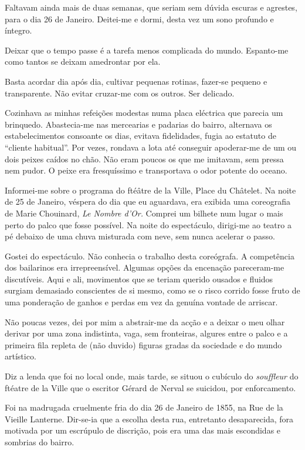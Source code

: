 Faltavam ainda mais de duas semanas, que seriam sem dúvida escuras e
agrestes, para o dia 26 de Janeiro. Deitei-me e dormi, desta vez um sono
profundo e íntegro.

Deixar que o tempo passe é a tarefa menos complicada do mundo.
Espanto-me como tantos se deixam amedrontar por ela.

Basta acordar dia após dia, cultivar pequenas rotinas,
fazer-se pequeno e transparente. Não evitar cruzar-me com os outros. Ser
delicado.

Cozinhava as minhas refeições modestas numa placa eléctrica que
parecia um brinquedo. Abastecia-me nas mercearias e padarias do bairro,
alternava os estabelecimentos consoante os dias, evitava fidelidades,
fugia ao estatuto de ``cliente habitual''. Por vezes, rondava a lota
até conseguir apoderar-me de um ou dois peixes caídos no chão. Não eram
poucos os que me imitavam, sem pressa nem pudor. O peixe era
fresquíssimo e transportava o odor potente do oceano.

Informei-me sobre o programa do ftéâtre de la Ville, Place du Châtelet.
Na noite de 25 de Janeiro, véspera do dia que eu aguardava, era exibida
uma coreografia de Marie Chouinard, \emph{Le Nombre d'Or. }Comprei um
bilhete num lugar o mais perto do palco que fosse possível. Na noite do
espectáculo, dirigi-me ao teatro a pé debaixo de uma chuva misturada com
neve, sem nunca acelerar o passo.

Gostei do espectáculo. Não conhecia o trabalho desta coreógrafa. A
competência dos bailarinos era irrepreensível. Algumas opções da
encenação pareceram-me discutíveis. Aqui e ali, movimentos que se teriam
querido ousados e fluidos surgiam demasiado conscientes de si mesmo,
como se o risco corrido fosse fruto de uma ponderação de ganhos e
perdas em vez da genuína vontade de arriscar.

Não poucas vezes, dei por mim a abstrair-me da acção e a deixar o meu
olhar derivar por uma zona indistinta, vaga, sem fronteiras, algures
entre o palco e a primeira fila repleta de (não duvido) figuras gradas
da sociedade e do mundo artístico.

Diz a lenda que foi no local onde, mais tarde, se situou o cubículo do
\emph{souffleur }do ftéatre de la Ville que o escritor Gérard de Nerval
se suicidou, por enforcamento.

Foi na madrugada cruelmente fria do dia 26 de Janeiro de 1855, na Rue de
la Vieille Lanterne. Dir-se-ia que a escolha desta rua, entretanto
desaparecida, fora motivada por um escrúpulo de discrição, pois era uma
das mais escondidas e sombrias do bairro.

